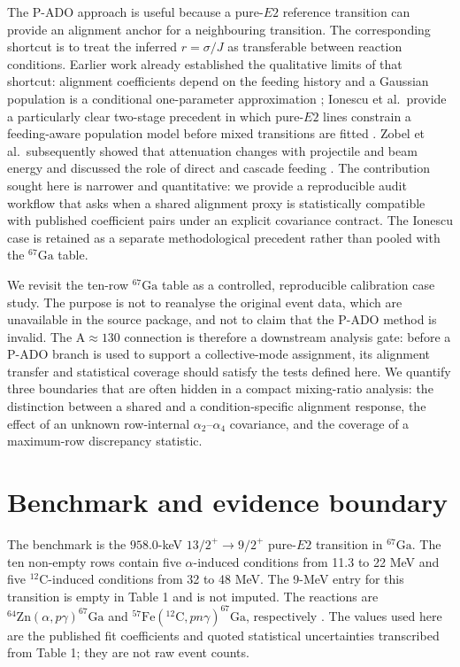 \documentclass[pdflatex,iicol,sn-mathphys-num]{sn-jnl}
\begin{document}
The P-ADO approach is useful because a pure-\(E2\) reference transition can provide an alignment anchor for a neighbouring transition. The corresponding shortcut is to treat the inferred \(r=\sigma/J\) as transferable between reaction conditions. Earlier work already established the qualitative limits of that shortcut: alignment coefficients depend on the feeding history and a Gaussian population is a conditional one-parameter approximation \cite{Zobel1980,Ionescu1981}; Ionescu et al.\ provide a particularly clear two-stage precedent in which pure-\(E2\) lines constrain a feeding-aware population model before mixed transitions are fitted \cite{Ionescu1981}. Zobel et al.\ subsequently showed that attenuation changes with projectile and beam energy and discussed the role of direct and cascade feeding \cite{Zobel1983}. The contribution sought here is narrower and quantitative: we provide a reproducible audit workflow that asks when a shared alignment proxy is statistically compatible with published coefficient pairs under an explicit covariance contract. The Ionescu case is retained as a separate methodological precedent rather than pooled with the \(^{67}\mathrm{Ga}\) table.

We revisit the ten-row \(^{67}\mathrm{Ga}\) table as a controlled, reproducible calibration case study. The purpose is not to reanalyse the original event data, which are unavailable in the source package, and not to claim that the P-ADO method is invalid. The A\(\approx130\) connection is therefore a downstream analysis gate: before a P-ADO branch is used to support a collective-mode assignment, its alignment transfer and statistical coverage should satisfy the tests defined here. We quantify three boundaries that are often hidden in a compact mixing-ratio analysis: the distinction between a shared and a condition-specific alignment response, the effect of an unknown row-internal \(\alpha_2\)--\(\alpha_4\) covariance, and the coverage of a maximum-row discrepancy statistic.

\section{Benchmark and evidence boundary}

The benchmark is the \(958.0\)-keV \(13/2^+\rightarrow9/2^+\) pure-\(E2\) transition in \(^{67}\mathrm{Ga}\). The ten non-empty rows contain five \(\alpha\)-induced conditions from 11.3 to 22 MeV and five \(^{12}\mathrm{C}\)-induced conditions from 32 to 48 MeV. The 9-MeV entry for this transition is empty in Table 1 and is not imputed. The reactions are \(^{64}\mathrm{Zn}(\alpha,p\gamma)^{67}\mathrm{Ga}\) and \(^{57}\mathrm{Fe}(^{12}\mathrm{C},pn\gamma)^{67}\mathrm{Ga}\), respectively \cite{Zobel1983}. The values used here are the published fit coefficients and quoted statistical uncertainties transcribed from Table 1; they are not raw event counts.
\end{document}
